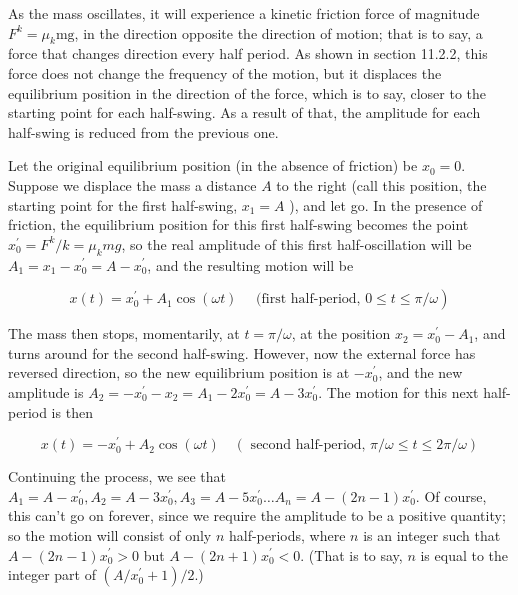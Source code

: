 \documentclass[10pt]{article}
\begin{document}
As the mass oscillates, it will experience a kinetic friction force of magnitude $F^{k}=\mu_{k} \mathrm{mg}$, in the direction opposite the direction of motion; that is to say, a force that changes direction every half period. As shown in section 11.2.2, this force does not change the frequency of the motion, but it displaces the equilibrium position in the direction of the force, which is to say, closer to the starting point for each half-swing. As a result of that, the amplitude for each half-swing is reduced from the previous one.

Let the original equilibrium position (in the absence of friction) be $x_{0}=0$. Suppose we displace the mass a distance $A$ to the right (call this position, the starting point for the first half-swing, $x_{1}=A$ ), and let go. In the presence of friction, the equilibrium position for this first half-swing becomes the point $x_{0}^{\prime}=F^{k} / k=\mu_{k} m g$, so the real amplitude of this first half-oscillation will be $A_{1}=x_{1}-x_{0}^{\prime}=A-x_{0}^{\prime}$, and the resulting motion will be


\begin{equation*}
\left.x(t)=x_{0}^{\prime}+A_{1} \cos (\omega t) \quad \text { (first half-period, } 0 \leq t \leq \pi / \omega\right) \tag{11.32}
\end{equation*}


The mass then stops, momentarily, at $t=\pi / \omega$, at the position $x_{2}=x_{0}^{\prime}-A_{1}$, and turns around for the second half-swing. However, now the external force has reversed direction, so the new equilibrium position is at $-x_{0}^{\prime}$, and the new amplitude is $A_{2}=-x_{0}^{\prime}-x_{2}=A_{1}-2 x_{0}^{\prime}=A-3 x_{0}^{\prime}$. The motion for this next half-period is then


\begin{equation*}
x(t)=-x_{0}^{\prime}+A_{2} \cos (\omega t) \quad(\text { second half-period, } \pi / \omega \leq t \leq 2 \pi / \omega) \tag{11.33}
\end{equation*}


Continuing the process, we see that $A_{1}=A-x_{0}^{\prime}, A_{2}=A-3 x_{0}^{\prime}, A_{3}=A-5 x_{0}^{\prime} \ldots A_{n}=A-(2 n-1) x_{0}^{\prime}$. Of course, this can't go on forever, since we require the amplitude to be a positive quantity; so the motion will consist of only $n$ half-periods, where $n$ is an integer such that $A-(2 n-1) x_{0}^{\prime}>0$ but $A-(2 n+1) x_{0}^{\prime}<0$. (That is to say, $n$ is equal to the integer part of $\left(A / x_{0}^{\prime}+1\right) / 2$.)
\end{document}
